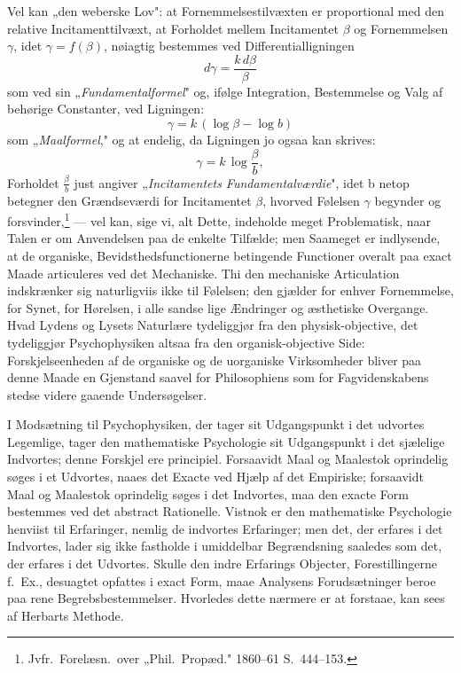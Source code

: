 \documentclass[12pt]{book}
\newcommand{\opage}[1]{\marginnote{\footnotesize\textit{[#1]}}}
\newcommand{\apage}[1]{\marginnote{\footnotesize\textit{[#1]}}}
\begin{document}
Vel kan „den weberske Lov": at Fornemmelsestilvæxten er proportional med den relative
Incitamenttilvæxt, at Forholdet mellem Incitamentet $\beta$ og Fornemmelsen $\gamma$, idet $\gamma =
f(\beta)$, nøiagtig bestemmes ved Differentialligningen
\[ d\gamma = \frac{k\,d\beta}{\beta} \]
som ved sin „\emph{Fundamentalformel}" og, ifølge Integration, Bestemmelse og Valg af behørige
Constanter, ved Ligningen:
\[ \gamma = k\,(\log\beta - \log b) \]
som „\emph{Maalformel}," og at endelig, da Ligningen jo ogsaa kan skrives:
\[ \gamma = k\,\log\frac{\beta}{b}, \]
Forholdet $\frac{\beta}{b}$ just angiver „\emph{Incitamentets Fundamentalværdie}", idet b netop
betegner den Grændseværdi for Incitamentet $\beta$, hvorved Følelsen $\gamma$ begynder og
forsvinder,\footnote{Jvfr.\ Forelæsn.\ over „Phil.\ Propæd." 1860--61 S.~444--153.} %
— vel kan, sige vi, alt Dette, indeholde meget Problematisk, naar Talen er om Anvendelsen paa de
enkelte Tilfælde; men Saameget er indlysende, at de organiske, Bevidsthedsfunctionerne betingende
Functioner overalt paa exact Maade articuleres ved det Mechaniske. Thi den mechaniske Articulation
indskrænker sig naturligviis ikke til Følelsen; den gjælder for enhver Fornemmelse, for Synet, for
Hørelsen, i alle sandse\-%
lige \apage{416} Ændringer og æsthetiske Overgange. Hvad Lydens og Lysets Naturlære tydeliggjør fra den
physisk-objective, det tydeliggjør Psychophysiken altsaa fra den organisk-objective Side:
Forskjelseenheden af de organiske og de uorganiske Virksomheder bliver paa denne Maade en Gjenstand
saavel for Philosophiens som for Fagvidenskabens stedse videre gaaende Undersøgelser.

I Modsætning til Psychophysiken, der tager sit Udgangspunkt i det udvortes Legemlige, tager den
mathematiske Psychologie sit Udgangspunkt i det sjælelige Indvortes; denne Forskjel ere principiel.
Forsaavidt Maal og Maalestok oprindelig søges i et Udvortes, naaes det Exacte ved Hjælp af det
Empiriske; forsaavidt Maal og Maalestok oprindelig søges i det Indvortes, maa den exacte Form
bestemmes ved det abstract Rationelle. Vistnok er den mathematiske Psychologie henviist til
Erfaringer, nemlig de indvortes Erfaringer; men det, der erfares i det Indvortes, lader sig ikke
fastholde i umiddelbar Begrændsning saaledes som det, der erfares i det Udvortes. Skulle den indre
Erfarings Objecter, Forestillingerne f.\ Ex., desuagtet opfattes i exact Form, maae Analysens
\opage{417} Forudsætninger beroe paa rene Begrebsbestemmelser. Hvorledes dette nærmere er at forstaae, kan sees
af Herbarts Methode.
\end{document}
